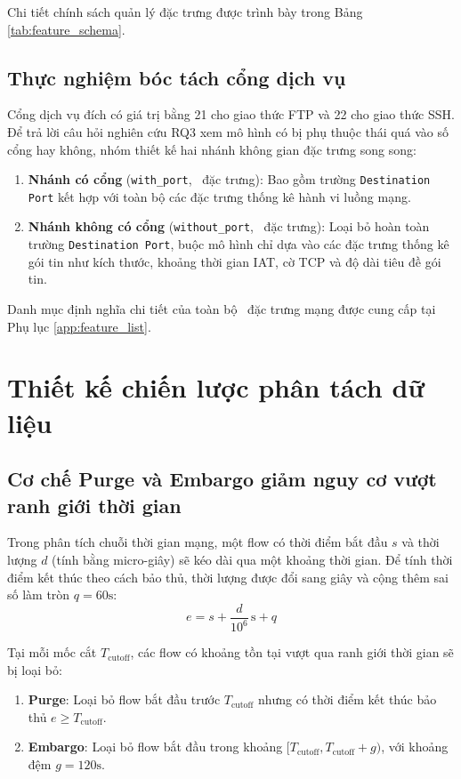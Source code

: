 Chi tiết chính sách quản lý đặc trưng được trình bày trong Bảng \ref{tab:feature_schema}.



\subsection{Thực nghiệm bóc tách cổng dịch vụ}
Cổng dịch vụ đích có giá trị bằng 21 cho giao thức FTP và 22 cho giao thức SSH. Để trả lời câu hỏi nghiên cứu RQ3 xem mô hình có bị phụ thuộc thái quá vào số cổng hay không, nhóm thiết kế hai nhánh không gian đặc trưng song song:
\begin{enumerate}
    \item \textbf{Nhánh có cổng} (\texttt{with\_port}, \FeatWithPortCount\ đặc trưng): Bao gồm trường \texttt{Destination Port} kết hợp với toàn bộ các đặc trưng thống kê hành vi luồng mạng.
    \item \textbf{Nhánh không có cổng} (\texttt{without\_port}, \FeatWithoutPortCount\ đặc trưng): Loại bỏ hoàn toàn trường \texttt{Destination Port}, buộc mô hình chỉ dựa vào các đặc trưng thống kê gói tin như kích thước, khoảng thời gian IAT, cờ TCP và độ dài tiêu đề gói tin.
\end{enumerate}

Danh mục định nghĩa chi tiết của toàn bộ \FeatWithPortCount\ đặc trưng mạng được cung cấp tại Phụ lục \ref{app:feature_list}.

\section{Thiết kế chiến lược phân tách dữ liệu}

\subsection{Cơ chế Purge và Embargo giảm nguy cơ vượt ranh giới thời gian}
Trong phân tích chuỗi thời gian mạng, một flow có thời điểm bắt đầu $s$ và thời lượng $d$ (tính bằng micro-giây) sẽ kéo dài qua một khoảng thời gian. Để tính thời điểm kết thúc theo cách bảo thủ, thời lượng được đổi sang giây và cộng thêm sai số làm tròn $q = 60\text{s}$:
\begin{equation}
    e = s + \frac{d}{10^6}\,\text{s} + q
\end{equation}

Tại mỗi mốc cắt $T_{\text{cutoff}}$, các flow có khoảng tồn tại vượt qua ranh giới thời gian sẽ bị loại bỏ:
\begin{enumerate}
    \item \textbf{Purge}: Loại bỏ flow bắt đầu trước $T_{\text{cutoff}}$ nhưng có thời điểm kết thúc bảo thủ $e \ge T_{\text{cutoff}}$.
    \item \textbf{Embargo}: Loại bỏ flow bắt đầu trong khoảng $[T_{\text{cutoff}}, T_{\text{cutoff}} + g)$, với khoảng đệm $g = 120\text{s}$.
\end{enumerate}


